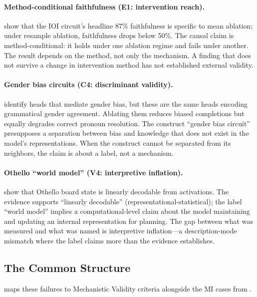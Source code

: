 \documentclass{article}
\begin{document}
\paragraph{Method-conditional faithfulness (E1: intervention reach).}
\citet{miller2024transformer} show that the IOI circuit's headline 87\% faithfulness is specific to mean ablation; under resample ablation, faithfulness drops below 50\%. The causal claim is method-conditional: it holds under one ablation regime and fails under another. The result depends on the method, not only the mechanism. A finding that does not survive a change in intervention method has not established external validity.

\paragraph{Gender bias circuits (C4: discriminant validity).}
\citet{vig2020gender} identify heads that mediate gender bias, but these are the same heads encoding grammatical gender agreement. Ablating them reduces biased completions but equally degrades correct pronoun resolution. The construct ``gender bias circuit'' presupposes a separation between bias and knowledge that does not exist in the model's representations. When the construct cannot be separated from its neighbors, the claim is about a label, not a mechanism.

\paragraph{Othello ``world model'' (V4: interpretive inflation).}
\citet{li2023othello} show that Othello board state is linearly decodable from activations. The evidence supports ``linearly decodable'' (representational-statistical); the label ``world model'' implies a computational-level claim about the model maintaining and updating an internal representation for planning. The gap between what was measured and what was named is interpretive inflation---a description-mode mismatch where the label claims more than the evidence establishes.

\subsection{The Common Structure}

 maps these failures to Mechanistic Validity criteria alongside the MI cases from .
\end{document}
